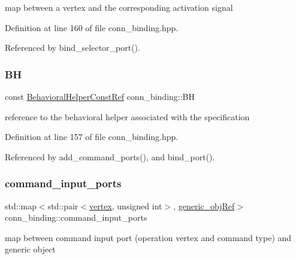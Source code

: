map between a vertex and the corresponding activation signal 



Definition at line 160 of file conn\+\_\+binding.\+hpp.



Referenced by bind\+\_\+selector\+\_\+port().

\mbox{\label{classconn__binding_a10ef50de9953e2267264484077bdbfdb}} 
\subsubsection{\texorpdfstring{BH}{BH}}
{\footnotesize\ttfamily const \hyperlink{behavioral__helper_8hpp_aae973b54cac87eef3b27442aa3e1e425}{Behavioral\+Helper\+Const\+Ref} conn\+\_\+binding\+::\+BH\hspace{0.3cm}{\ttfamily [protected]}}



reference to the behavioral helper associated with the specification 



Definition at line 157 of file conn\+\_\+binding.\+hpp.



Referenced by add\+\_\+command\+\_\+ports(), and bind\+\_\+port().

\mbox{\label{classconn__binding_a37d4850b1509016aefb78063be87bf97}} 
\subsubsection{\texorpdfstring{command\+\_\+input\+\_\+ports}{command\_input\_ports}}
{\footnotesize\ttfamily std\+::map$<$std\+::pair$<$\hyperlink{graph_8hpp_abefdcf0544e601805af44eca032cca14}{vertex}, unsigned int$>$, \hyperlink{generic__obj_8hpp_acb533b2ef8e0fe72e09a04d20904ca81}{generic\+\_\+obj\+Ref}$>$ conn\+\_\+binding\+::command\+\_\+input\+\_\+ports\hspace{0.3cm}{\ttfamily [protected]}}



map between command input port (operation vertex and command type) and generic object 



